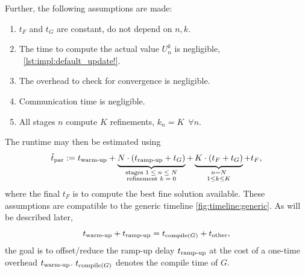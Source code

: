 \pagebreak
\noindent
Further, the following assumptions are made:
\begin{enumerate}
  \item
    \label{item:impl:assumption:tF}
    $t_F$ and $t_G$ are constant, \ie do not depend on $n, k$.
  \item
    \label{item:impl:assumption:tU}
    The time to compute the actual value $U_n^k$ is negligible,
    \cf~\autoref{lst:impl:default_update!}.
  \item
    The overhead to check for convergence is negligible.
  \item
    Communication time is negligible.
  \item
    All stages $n$ compute $K$ refinements, \ie $k_n = K \enspace\forall n$.
\end{enumerate}
The runtime may then be estimated using
\begin{equation}
\label{eq:impl:tpar}
  \hattpar
  := \twarmup
  + \underbrace{
    \strut
    N \cdot (\trampup + t_G)
  }_{\substack{
    \text{stages $1\leq n\leq N$}\\
    \text{refinement $k=0$}
  }}
  + \underbrace{
    \strut
    K \cdot (t_F + t_G)
  }_{\substack{
    \vphantom{\text{stage}}
    n = N \\
    1 \leq k \leq K
  }}
  + t_F
  ,
\end{equation}
where the final $t_F$ is to compute the best fine solution available.
These assumptions are compatible to the generic timeline \autoref{fig:timeline:generic}.
As will be described later,
\begin{equation}
  t_\text{warm-up} + t_\text{ramp-up}
  = t_{\operatorname{compile}(G)} + t_\text{other}
  ,
\end{equation}
\ie the goal is to offset/reduce the ramp-up delay $t_\text{ramp-up}$
at the cost of a one-time overhead $t_\text{warm-up}$.
$t_{\operatorname{compile}(G)}$ denotes the compile time of $G$.

